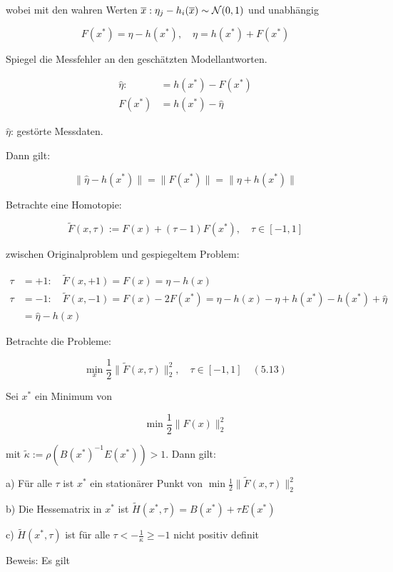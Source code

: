 wobei mit den wahren Werten $\overline x: \eta_j - h_i(\overline x) \sim \mathcal N(0,1)$ und unabhängig

\[ F(x^*) = \eta - h(x^*), \quad \eta = h(x^*) + F(x^*) \]

Spiegel die Messfehler an den geschätzten Modellantworten.

\begin{align*}
\hat \eta :&= h(x^*) - F(x^*) \\
F(x^*) &= h(x^*) - \hat \eta
\end{align*}

$\hat \eta$: gestörte Messdaten.

Dann gilt:

\[ \| \hat \eta - h(x^*) \| = \|F(x^*)\| = \|\eta + h(x^*) \| \]

Betrachte eine Homotopie:

\[ \tilde F(x,\tau) := F(x) + (\tau-1) F(x^*), \quad \tau \in [-1,1] \]

zwischen Originalproblem und gespiegeltem Problem:

\begin{align*}
\tau &= +1: \quad \tilde F(x,+1) = F(x) = \eta - h(x) \\
\tau &= -1: \quad \tilde F(x,-1) = F(x) - 2 F(x^*) = \eta - h(x) - \eta + h(x^*) - h(x^*) + \hat \eta \\
&= \hat \eta - h(x)
\end{align*}

Betrachte die Probleme:

\[ \min_x \frac 12 \|\tilde F(x,\tau)\|_2^2, \quad \tau \in [-1,1] \quad (5.13) \]


Sei $x^*$ ein Minimum von

\[ \min \frac 12 \| F(x)\|_2^2 \]

mit $\tilde \kappa := \rho( B(x^*)^{-1} E(x^*) ) > 1$. Dann gilt:

\bitm
\item a) Für alle $\tau$ ist $x^*$ ein stationärer Punkt von $\min \frac 12 \|\tilde F(x,\tau)\|_2^2$
\item b) Die Hessematrix in $x^*$ ist $\tilde H(x^*,\tau) = B(x^*) + \tau E(x^*)$
\item c) $\tilde H(x^*, \tau)$ ist für alle $\tau < - \frac 1\kappa \geq -1 $ nicht positiv definit 
\eitm

Beweis: Es gilt 

